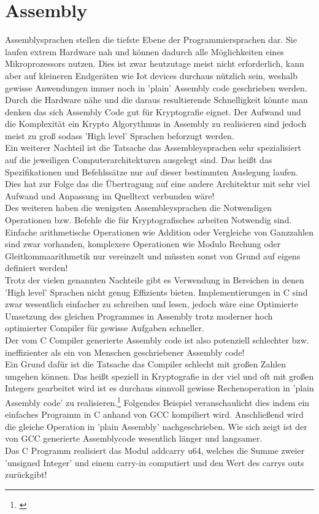 \documentclass[a4paper,12pt]{scrartcl}
\begin{document}
\section{Assembly}
Assemblysprachen stellen die tiefste Ebene der Programmiersprachen dar.
Sie laufen extrem Hardware nah und können dadurch alle Möglichkeiten eines Mikroprozessors nutzen. Dies ist zwar heutzutage meist nicht erforderlich, kann aber auf kleineren Endgeräten wie Iot devices durchaus nützlich sein, weshalb gewisse Anwendungen immer noch in 'plain' Assembly code geschrieben werden.\\ Durch die Hardware nähe und die daraus resultierende Schnelligkeit könnte man denken das sich Assembly Code gut für Kryptografie eignet. Der Aufwand und die Komplexität ein Krypto Algorythmus in Assembly zu realisieren sind jedoch meist zu groß sodass 'High level' Sprachen beforzugt werden.\\
Ein weiterer Nachteil ist die Tatsache das Assembleysprachen sehr spezialisiert auf die jeweiligen Computerarchitekturen ausgelegt sind. Das heißt das Spezifikationen und Befehlssätze nur auf dieser bestimmten Auslegung laufen. Dies hat zur Folge das die Übertragung auf eine andere Architektur mit sehr viel Aufwand und Anpassung im Quelltext verbunden wäre!\\
Des weiteren haben die wenigsten Assembleysprachen die Notwendigen Operationen bzw. Befehle die für Kryptografisches arbeiten Notwendig sind. Einfache arithmetische Operationen wie Addition oder Vergleiche von Ganzzahlen sind zwar vorhanden, komplexere Operationen wie Modulo Rechung oder Gleitkommaarithmetik nur vereinzelt und müssten sonst von Grund auf eigens definiert werden!\\
Trotz der vielen genannten Nachteile gibt es Verwendung in Bereichen in denen 'High level' Sprachen nicht genug Effizients bieten. Implementierungen in C sind zwar wesentlich einfacher zu schreiben und lesen, jedoch wäre eine Optimierte Umsetzung des gleichen Programmes in Assembly trotz moderner hoch optimierter Compiler für gewisse Aufgaben schneller.\\
Der vom C Compiler generierte Assembly code ist also potenziell schlechter bzw. ineffizienter als ein von Menschen geschriebener Assembly code!\\ Ein Grund dafür ist die Tatsache das Compiler schlecht mit großen Zahlen umgehen können. Das heißt speziell in Kryptografie in der viel und oft mit großen Integers gearbeitet wird ist es durchaus sinnvoll gewisse Rechenoperation in 'plain Assembly code' zu realisieren.\footnote{\cite{738514}}
\newpage
Folgendes Beispiel veranschaulicht dies indem ein einfaches Programm in C anhand von GCC kompiliert wird. Anschließend wird die gleiche Operation in 'plain Assembly' nachgeschrieben. Wie sich zeigt ist der von GCC generierte Assemblycode wesentlich länger und langsamer.\\
Das C Programm realisiert das Modul addcarry u64, welches die Summe zweier 'unsigned Integer' und einem carry-in computiert und den Wert des carrys outs zurückgibt!
\vspace{2 mm}
\end{document}
